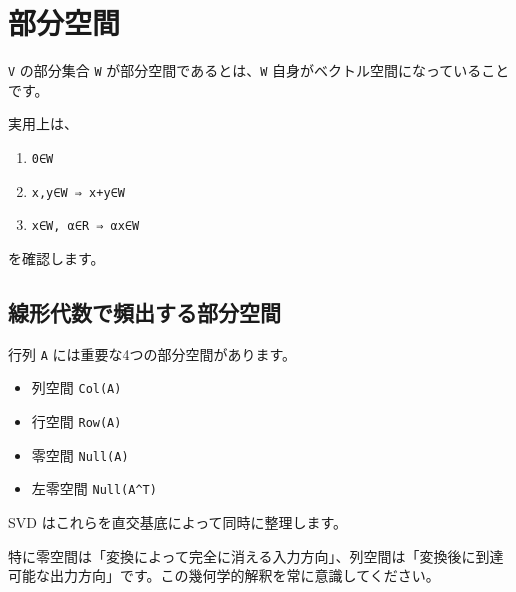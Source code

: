 \documentclass[
  11pt,
  a4paper,
]{ltjsarticle}
\author{}
\date{}
\providecommand{\tightlist}{%
  \setlength{\itemsep}{0pt}\setlength{\parskip}{0pt}}
\begin{document}
\hypertarget{ux90e8ux5206ux7a7aux9593}{%
\section{部分空間}\label{ux90e8ux5206ux7a7aux9593}}

\texttt{V} の部分集合 \texttt{W} が部分空間であるとは、\texttt{W}
自身がベクトル空間になっていることです。

実用上は、

\begin{enumerate}
\def\labelenumi{\arabic{enumi}.}
\tightlist
\item
  \texttt{0∈W}
\item
  \texttt{x,y∈W\ ⇒\ x+y∈W}
\item
  \texttt{x∈W,\ α∈R\ ⇒\ αx∈W}
\end{enumerate}

を確認します。

\hypertarget{ux7ddaux5f62ux4ee3ux6570ux3067ux983bux51faux3059ux308bux90e8ux5206ux7a7aux9593}{%
\subsection{線形代数で頻出する部分空間}\label{ux7ddaux5f62ux4ee3ux6570ux3067ux983bux51faux3059ux308bux90e8ux5206ux7a7aux9593}}

行列 \texttt{A} には重要な4つの部分空間があります。

\begin{itemize}
\tightlist
\item
  列空間 \texttt{Col(A)}
\item
  行空間 \texttt{Row(A)}
\item
  零空間 \texttt{Null(A)}
\item
  左零空間 \texttt{Null(A\^{}T)}
\end{itemize}

SVD はこれらを直交基底によって同時に整理します。

特に零空間は「変換によって完全に消える入力方向」、列空間は「変換後に到達可能な出力方向」です。この幾何学的解釈を常に意識してください。
\end{document}
